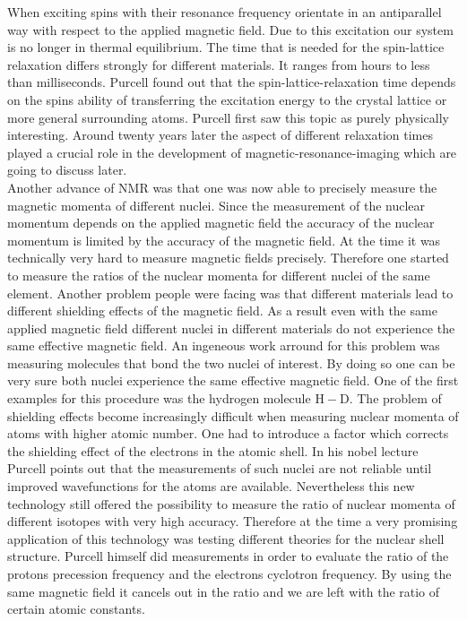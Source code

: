 \documentclass{article}
\begin{document}
When exciting spins with their resonance frequency  orientate in an antiparallel way with respect to the applied magnetic field. Due to this excitation our system is no longer in thermal equilibrium. The time that is needed for the spin-lattice relaxation differs strongly for different materials. It ranges from hours to less than milliseconds. Purcell found out that the spin-lattice-relaxation time depends on the spins ability of transferring the excitation energy to the crystal lattice or more general surrounding atoms. Purcell first saw this topic as purely physically interesting. Around twenty years later the aspect of different relaxation times played a crucial role in the development of magnetic-resonance-imaging which are going to discuss later.\\




Another advance of NMR was that one was now able to precisely measure the magnetic momenta of different nuclei. Since the measurement of the nuclear momentum depends on the applied magnetic field the accuracy of the nuclear momentum is limited by the accuracy of the magnetic field. At the time it was technically very hard to measure magnetic fields precisely. Therefore one started to measure the ratios of the nuclear momenta for different nuclei of the same element. Another problem people were facing was that different materials lead to different shielding effects of the magnetic field. As a result even with the same applied magnetic field different nuclei in different materials do not experience the same effective magnetic field. An ingeneous work arround for this problem was measuring molecules that bond the two nuclei of interest. By doing so one can be very sure both nuclei experience the same effective magnetic field. One of the first examples for this procedure was the hydrogen molecule $\mathrm{H-D}$. The problem of shielding effects become increasingly difficult when measuring nuclear momenta of atoms with higher atomic number. One had to introduce a factor which corrects the shielding effect of the electrons in the atomic shell. In his nobel lecture Purcell points out that the measurements of such nuclei are not reliable until improved wavefunctions for the atoms are available. Nevertheless this new technology still offered the possibility to measure the ratio of nuclear momenta of different isotopes with very high accuracy. Therefore at the time a very promising application of this technology was testing different theories for the nuclear shell structure. Purcell himself did measurements in order to evaluate the ratio of the protons precession frequency and the electrons cyclotron frequency. By using the same magnetic field it cancels out in the ratio and we are left with the ratio of certain atomic constants. \\ 
\end{document}
